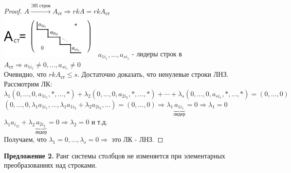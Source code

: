 \documentclass[a4paper, 12pt]{article}
\theoremstyle{definition}
\begin{document}
  \begin{proof}
    $A \overset{\text{ЭП строк}}{\longrightarrow } A_{\text{ст}} \Longrightarrow  rkA = rkA_{\text{ст}}$ \\
    \includegraphics[width=5cm]{image/matr2.pdf}
    $a_{1i_1},...,a_{si_s}$ - лидеры строк в $A_{\text{ст}} \Longrightarrow a_{1i_1} \neq 0,...,a_{si_s} \neq 0$ \\
    Очевидно, что $rkA_{\text{ст}}\leq s$. Достаточно доказать, что ненулевые строки ЛНЗ. 
    Рассмотрим ЛК: \\
    $\lambda_1(0,...,0,a_{1i_1},\ast,...,\ast) + \lambda_2(0,...,0,a_{2i_2},\ast,...,\ast) + \cdots + \lambda_s(0,...,0,a_{si_s},\ast,...,\ast) = (0,...,0)$ \\
    $(0,...,0,\lambda_1 a_{1i_1},...,\lambda_1a_{1i_2} + \lambda_2a_{2i_2},...) = (0,...,0) \Longrightarrow \lambda_1 \underbrace {a_{1i_1}}_{\text{лидер}}= 0 \Longrightarrow \lambda_1 = 0$ \\
    $\lambda_1a_{i_21} + \lambda_2\underbrace {a_{2i_2}}_{\text{лидер}} = 0 \Longrightarrow \lambda_2 = 0$ и т.д. \\
    Получаем, что $\lambda_1 = 0,...,\lambda_s = 0 \Longrightarrow$ это ЛК - ЛНЗ. 
  \end{proof} 
  \textbf{Предложение 2.} 
  Ранг системы столбцов не изменяется при элементарных преобразованиях над строками. 
  
\end{document}
